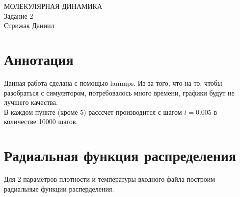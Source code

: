 




\maketitle
\begin{center}
\LARGE{МОЛЕКУЛЯРНАЯ ДИНАМИКА}\\
    \Large{Задание 2}\\
    Стрижак Даниил
\end{center}
\tableofcontents
\newpage

\section{Аннотация}
 Данная работа сделана с помощью lammps. Из-за того, что на то, чтобы разобраться с симулятором, потребовалось много времени, графики будут не лучшего качества. \\
 В каждом пункте (кроме 5) расссчет производится с шагом $t = 0.005$ в количестве 10000 шагов. 
 
 
\section{Радиальная функция распределения}

Для 2 параметров плотности и температуры входного файла построим радиальные функции расперделения. 

